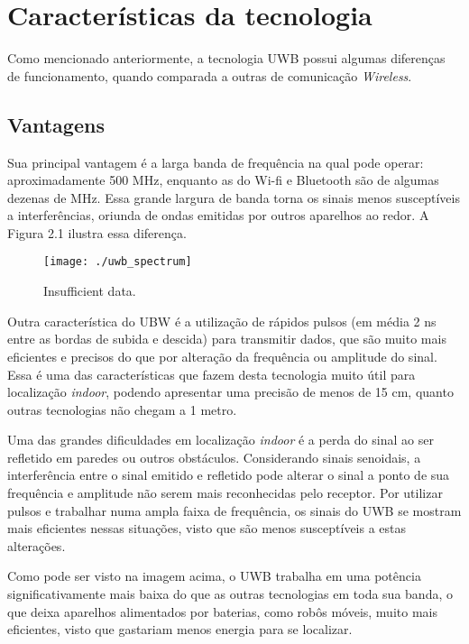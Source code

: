 \section{Características da tecnologia}
\label{sec:ass1}
Como mencionado anteriormente, a tecnologia UWB possui algumas diferenças de funcionamento,
quando comparada a outras de comunicação \textit{Wireless}. 

\subsection{Vantagens}
Sua principal vantagem é a larga banda de frequência na qual pode operar: aproximadamente 500 MHz, 
enquanto as do Wi-fi e Bluetooth são de algumas dezenas de MHz. Essa grande largura de banda torna 
os sinais menos susceptíveis a interferências, oriunda de ondas emitidas por outros aparelhos ao redor.
A Figura 2.1 ilustra essa diferença.

\begin{figure} [h!]												 
	\centering													 
	\texttt{[image: ./uwb\_spectrum]}				 
	\caption{Insufficient data.}		
	\label{img:ihuma}												 
\end{figure}

Outra característica do UBW é a utilização de rápidos pulsos (em média 2 ns entre as bordas de subida e descida) para transmitir dados, 
que são muito mais eficientes e precisos do que por alteração da frequência ou amplitude do sinal. Essa é uma das características
que fazem desta tecnologia muito útil para localização \textit{indoor}, podendo apresentar uma precisão de menos de 15 cm,
quanto outras tecnologias não chegam a 1 metro.

Uma das grandes dificuldades em localização \textit{indoor} é a perda do sinal ao ser refletido em paredes ou outros obstáculos. Considerando sinais
senoidais, a interferência entre o sinal emitido e refletido pode alterar o sinal a ponto de sua frequência e amplitude não serem
mais reconhecidas pelo receptor. Por utilizar pulsos e trabalhar numa ampla faixa de frequência, os sinais do UWB se mostram mais 
eficientes nessas situações, visto que são menos susceptíveis a estas alterações. 

Como pode ser visto na imagem acima, o UWB trabalha em uma potência significativamente mais baixa do que as outras tecnologias em 
toda sua banda, o que deixa aparelhos alimentados por baterias, como robôs móveis, muito mais eficientes, visto que gastariam menos energia
para se localizar.

